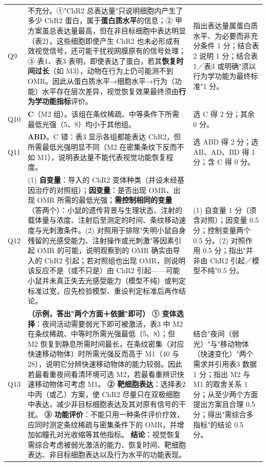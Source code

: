 \documentclass[UTF8,a4paper,11pt]{ctexart}
\begin{document}
\begin{longtable}{@{}p{0.9cm}p{9.6cm}p{4.2cm}@{}}
\addlinespace
Q9 & 不充分。①"ChR2 总表达量"只说明细胞内产生了多少 ChR2 蛋白，属于\textbf{蛋白质水平}的信息；② 甲方案虽总表达量最高，但在非目标细胞中表达明显（表2），这些细胞即使产生 ChR2 也未必形成有效视觉信号，还可能干扰视网膜原有的信号处理；③ 表1、表3 表明，即使表达了蛋白，若其\textbf{恢复时间过长}（如 M3），动物在行为上仍可能测不到 OMR。因此从蛋白质水平→细胞水平→行为（功能）水平存在层次差异，视觉恢复效果最终须由\textbf{行为学功能指标}评价。 & 指出表达量属蛋白质水平、为必要而非充分条件 1 分；结合表2 说明 1 分；结合表1／表3 或明确"须以行为学功能为最终标准"1 分。 \\
\addlinespace
Q10 & \textbf{C}（M2 组）。该组在条纹稀疏、中等条件下所需最低光强（5、8）均小于其他组。 & 选 C 得 2 分；其余 0 分。 \\
\addlinespace
Q11 & \textbf{ABD}。C 错：表3 显示各组都能表达 ChR2，但所需最低光强明显不同（M2 在密集条纹下反而不如 M1），说明表达量不能代表视觉功能恢复程度。 & 选 ABD 得 2 分；选 AB、AD、BD 得 1 分；含 C 得 0 分。 \\
\addlinespace
Q12 & (1) \textbf{自变量}：导入的 ChR2 变体种类（并设未经基因治疗的对照组）；\textbf{因变量}：是否出现 OMR、出现 OMR 所需的最低光强；\textbf{需控制相同的变量}（答两个）：小鼠的遗传背景与生理状态、注射的载体量与浓度、注射后至测定的时间、条纹移动速度与光刺激条件。(2) 对照用于排除"失明小鼠自身残留的光感受能力、注射操作或光刺激"等因素引起 OMR 的可能，说明观察到的 OMR 确实由导入的 ChR2 引起；若对照组也出现 OMR，则说明该反应不是（或不只是）由 ChR2 引起——可能小鼠并未真正失去光感受能力（模型不纯）或判定标准过宽，应先检验模型、重设判定标准后再作结论。 & (1) 自变量 1 分（须含对照）；因变量 0.5 分；控制变量两个 0.5 分。(2) 对照作用 0.5 分；指出"并非由 ChR2 引起／模型不纯"0.5 分。 \\
\addlinespace
Q13 & \textbf{（示例，答出"两个方面＋依据"即可）}\newline
\textbf{① 变体选择}：夜间活动需要弱光下即可被激活，表3 中 M2 在条纹稀疏、中等时所需光强最低（5、8）；但 M2 恢复到静息所需时间最长，在条纹密集（对应快速移动物体）时所需光强反而高于 M1（40 与 28），说明它分辨快速移动物体的能力较弱。因此若最看重夜间看清环境可选 M2，若最看重辨识快速移动物体可考虑 M1。\newline
\textbf{② 靶细胞表达}：选择表2 中丙（或乙）方案，使 ChR2 尽量只在双极细胞中表达，减少非目标细胞表达及其对原有信号的干扰。\newline
\textbf{③ 功能评价}：不能只用一种条件评价疗效，应同时测定条纹稀疏与密集条件下的 OMR，并增加如瞳孔对光收缩等其他指标。\newline
\textbf{结论}：视觉恢复需综合考虑被弱光激活的能力、恢复时间、靶细胞表达、非目标细胞表达以及行为水平的功能表现。 & 结合"夜间（弱光）"与"移动物体（快速变化）"两个需求并引用表3 数据 1 分；指出 M2 与 M1 的取舍关系 1 分；从至少两个方面提出方案且合理 0.5 分；得出"需综合多指标"的结论 0.5 分。 \\
\bottomrule
\end{longtable}
\end{document}
